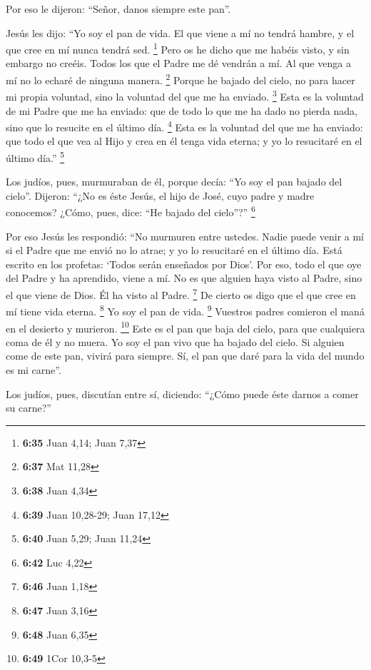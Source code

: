 \begin{paracol}{2}
 Por eso le dijeron: ``Señor, danos siempre este pan''.

 Jesús les dijo: ``Yo soy el pan de vida. El que viene a
mí no tendrá hambre, y el que cree en mí nunca tendrá sed. \footnote{\textbf{6:35}
  Juan 4,14; Juan 7,37}  Pero os he dicho que me habéis
visto, y sin embargo no creéis.  Todos los que el Padre
me dé vendrán a mí. Al que venga a mí no lo echaré de ninguna manera.
\footnote{\textbf{6:37} Mat 11,28}  Porque he bajado del
cielo, no para hacer mi propia voluntad, sino la voluntad del que me ha
enviado. \footnote{\textbf{6:38} Juan 4,34}  Esta es la
voluntad de mi Padre que me ha enviado: que de todo lo que me ha dado no
pierda nada, sino que lo resucite en el último día. \footnote{\textbf{6:39}
  Juan 10,28-29; Juan 17,12}  Esta es la voluntad del que
me ha enviado: que todo el que vea al Hijo y crea en él tenga vida
eterna; y yo lo resucitaré en el último día.'' \footnote{\textbf{6:40}
  Juan 5,29; Juan 11,24}

 Los judíos, pues, murmuraban de él, porque decía: ``Yo
soy el pan bajado del cielo''.  Dijeron: ``¿No es éste
Jesús, el hijo de José, cuyo padre y madre conocemos? ¿Cómo, pues, dice:
``He bajado del cielo''?'' \footnote{\textbf{6:42} Luc 4,22}

 Por eso Jesús les respondió: ``No murmuren entre
ustedes.  Nadie puede venir a mí si el Padre que me envió
no lo atrae; y yo lo resucitaré en el último día.  Está
escrito en los profetas: `Todos serán enseñados por Dios'. Por eso, todo
el que oye del Padre y ha aprendido, viene a mí.  No es
que alguien haya visto al Padre, sino el que viene de Dios. Él ha visto
al Padre. \footnote{\textbf{6:46} Juan 1,18}  De cierto
os digo que el que cree en mí tiene vida eterna. \footnote{\textbf{6:47}
  Juan 3,16}  Yo soy el pan de vida. \footnote{\textbf{6:48}
  Juan 6,35}  Vuestros padres comieron el maná en el
desierto y murieron. \footnote{\textbf{6:49} 1Cor 10,3-5}
 Este es el pan que baja del cielo, para que cualquiera
coma de él y no muera.  Yo soy el pan vivo que ha bajado
del cielo. Si alguien come de este pan, vivirá para siempre. Sí, el pan
que daré para la vida del mundo es mi carne''.

 Los judíos, pues, discutían entre sí, diciendo: ``¿Cómo
puede éste darnos a comer su carne?''


\end{paracol}
